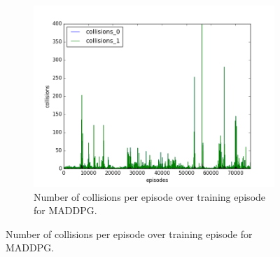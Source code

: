 \begin{figure}[h]
\begin{subfigure}[h]{\figscale\linewidth}
    \includegraphics[trim=10 10 10 10,clip,width=\linewidth]
    {../results/maddpg_1vs1/collisions.png}
    \caption{Number of collisions per episode over training episode for MADDPG.}
    \label{fig:maddpg-1vs1-collisions}
  \end{subfigure}


\end{figure}
